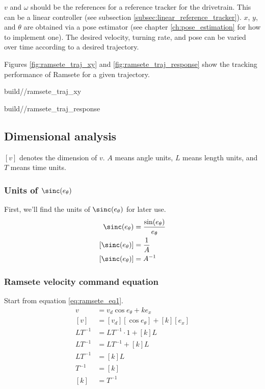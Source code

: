 $v$ and $\omega$ should be the \glspl{reference} for a \gls{reference} tracker
for the drivetrain. This can be a linear controller (see subsection
\ref{subsec:linear_reference_tracker}). $x$, $y$, and $\theta$ are obtained via
a \gls{pose} estimator (see chapter \ref{ch:pose_estimation} for how to
implement one). The desired velocity, turning rate, and \gls{pose} can be varied
over time according to a desired trajectory.

Figures \ref{fig:ramsete_traj_xy} and \ref{fig:ramsete_traj_response} show the
tracking performance of Ramsete for a given trajectory.
\begin{bookfigure}
  \begin{minisvg}{2}{build/\chapterpath/ramsete_traj_xy}
    \caption{Ramsete nonlinear controller x-y plot}
    \label{fig:ramsete_traj_xy}
  \end{minisvg}
  \hfill
  \begin{minisvg}{2}{build/\chapterpath/ramsete_traj_response}
    \caption{Ramsete nonlinear controller response}
    \label{fig:ramsete_traj_response}
  \end{minisvg}
\end{bookfigure}

\subsection{Dimensional analysis}

$[v]$ denotes the dimension of $v$. $A$ means angle units, $L$ means length
units, and $T$ means time units.

\subsubsection{Units of $\sinc(e_\theta)$}

First, we'll find the units of $\sinc(e_\theta)$ for later use.
\begin{align*}
  \sinc(e_\theta) &= \frac{\sin(e_\theta)}{e_\theta} \\
  [\sinc(e_\theta)] &= \frac{1}{A} \\
  [\sinc(e_\theta)] &= A^{-1}
\end{align*}

\subsubsection{Ramsete velocity command equation}

Start from equation \eqref{eq:ramsete_eq1}.
\begin{align*}
  v &= v_d \cos e_\theta + k e_x \\
  [v] &= [v_d] [\cos e_\theta] + [k] [e_x] \\
  L T^{-1} &= L T^{-1} \cdot 1 + [k] L \\
  L T^{-1} &= L T^{-1} + [k] L \\
  L T^{-1} &= [k] L \\
  T^{-1} &= [k] \\
  [k] &= T^{-1}
\end{align*}

